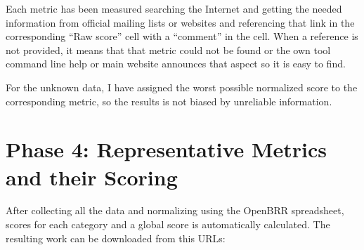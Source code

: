 \documentclass[a4paper,12pt]{book}
\begin{document}
Each metric has been measured searching the Internet and getting the needed information from official mailing lists or websites and referencing that link in the corresponding ``Raw score'' cell with a ``comment'' in the cell. When a
reference is not provided, it means that that metric could not be found or the own tool command line help or main website announces that aspect so it is
easy to find.

For the unknown data, I have assigned the worst possible normalized score to
the corresponding metric, so the results is not biased by unreliable
information.

\section{Phase 4: Representative Metrics and their Scoring}
\label{sec:phase4}

After collecting all the data and normalizing using the OpenBRR spreadsheet,
scores for each category and a global score is automatically calculated.
The resulting work can be downloaded from this URLs:
\end{document}
